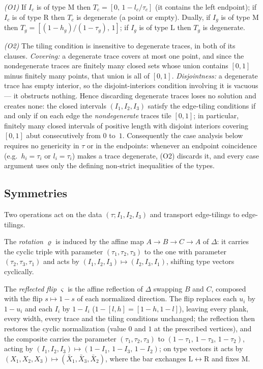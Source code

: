 \documentclass[11pt,reqno]{amsart}
\theoremstyle{plain}
\theoremstyle{definition}
\theoremstyle{remark}
\begin{document}
\emph{(O1)} If $I_c$ is of type $\mathrm M$ then $T_c=[0,\,1-l_c/\tau_c]$ (it
contains the left endpoint); if $I_c$ is of type $\mathrm R$ then $T_c$ is
degenerate (a point or empty). Dually, if $I_g$ is of type $\mathrm M$ then
$T_g=[(1-h_g)/(1-\tau_g),\,1]$; if $I_g$ is of type $\mathrm L$ then $T_g$ is
degenerate.

\emph{(O2)} The tiling condition is insensitive to degenerate traces, in both
of its clauses. \emph{Covering:} a degenerate trace covers at most one point,
and since the nondegenerate traces are finitely many closed sets whose union
contains $[0,1]$ minus finitely many points, that union is all of $[0,1]$.
\emph{Disjointness:} a degenerate trace has empty interior, so the
disjoint-interiors condition involving it is vacuous --- it obstructs
nothing. Hence discarding degenerate traces loses no solution and creates
none: the closed intervals $(I_1,I_2,I_3)$ satisfy the edge-tiling conditions
if and only if on each edge the \emph{nondegenerate} traces tile $[0,1]$; in
particular, finitely many closed intervals of positive
length with disjoint interiors covering $[0,1]$ abut consecutively from $0$
to~$1$. Consequently the case analysis below requires no genericity in $\tau$
or in the endpoints: whenever an endpoint coincidence (e.g.\ $h_i=\tau_i$ or
$l_i=\tau_i$) makes a trace degenerate, (O2) discards it, and every case
argument uses only the defining non-strict inequalities of the types.

\subsection*{Symmetries}
Two operations act on the data $(\tau;I_1,I_2,I_3)$ and transport edge-tilings
to edge-tilings.

The \emph{rotation} $\varrho$ is induced by the affine map $A\to B\to C\to A$
of $\Delta$: it carries the cyclic triple with parameter
$(\tau_1,\tau_2,\tau_3)$ to the one with parameter $(\tau_2,\tau_3,\tau_1)$ and
acts by $(I_1,I_2,I_3)\mapsto(I_2,I_3,I_1)$, shifting type vectors cyclically.

The \emph{reflected flip} $\varsigma$ is the affine reflection of $\Delta$
swapping $B$ and $C$, composed with the flip $s\mapsto1-s$ of each normalized
direction. The flip replaces each $u_i$ by $1-u_i$ and each $I_i$ by $1-I_i$
($1-[l,h]=[1-h,1-l]$), leaving every plank, every width, every trace and the
tiling conditions unchanged; the reflection then restores the cyclic
normalization (value $0$ and $1$ at the prescribed vertices), and the composite
carries the parameter $(\tau_1,\tau_2,\tau_3)$ to
$(1-\tau_1,\,1-\tau_3,\,1-\tau_2)$, acting by
$(I_1,I_2,I_3)\mapsto(1-I_1,\,1-I_3,\,1-I_2)$; on type vectors it acts by
$(X_1,X_2,X_3)\mapsto(\bar X_1,\bar X_3,\bar X_2)$, where the bar exchanges
$\mathrm L\leftrightarrow\mathrm R$ and fixes $\mathrm M$.
\end{document}
